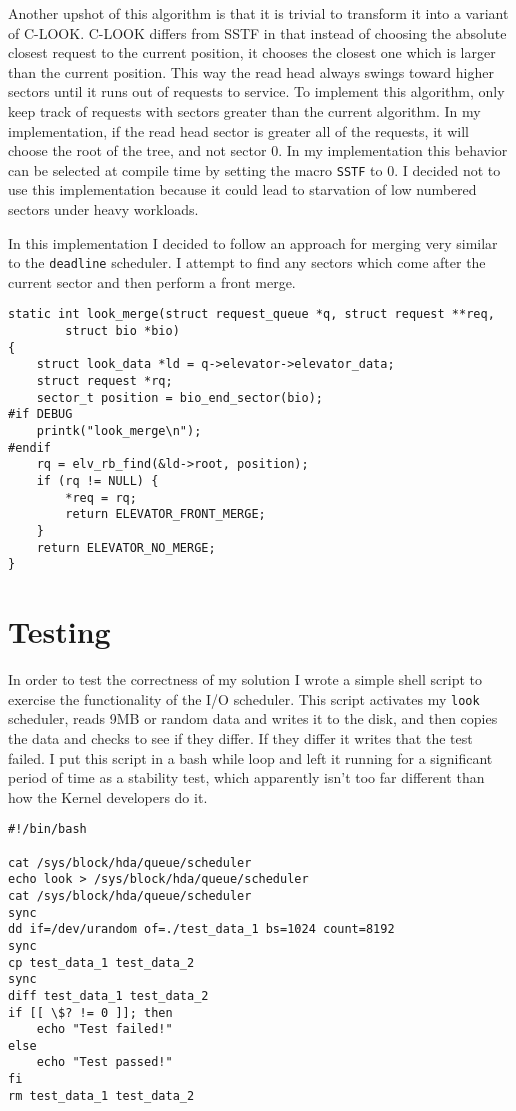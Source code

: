 \documentclass[10pt,conference,draftclsnofoot,onecolumn]{IEEEtran}
\begin{document}
Another upshot of this algorithm is that it is trivial to transform it into a variant of C-LOOK. C-LOOK differs from SSTF in that instead of choosing the absolute closest request to the current position, it chooses the closest one which is larger than the current position. This way the read head always swings toward higher sectors until it runs out of requests to service. To implement this algorithm, only keep track of requests with sectors greater than the current algorithm. In my implementation, if the read head sector is greater all of the requests, it will choose the root of the tree, and not sector 0. In my implementation this behavior can be selected at compile time by setting the macro \texttt{SSTF} to 0. I decided not to use this implementation because it could lead to starvation of low numbered sectors under heavy workloads.

In this implementation I decided to follow an approach for merging very similar to the \texttt{deadline} scheduler. I attempt to find any sectors which come after the current sector and then perform a front merge.

\begin{lstlisting}
static int look_merge(struct request_queue *q, struct request **req,
		struct bio *bio)
{
	struct look_data *ld = q->elevator->elevator_data;
	struct request *rq;
	sector_t position = bio_end_sector(bio);
#if DEBUG
	printk("look_merge\n");
#endif
	rq = elv_rb_find(&ld->root, position);
	if (rq != NULL) {
		*req = rq;
		return ELEVATOR_FRONT_MERGE;
	}
	return ELEVATOR_NO_MERGE;
}
\end{lstlisting}

\section{Testing}
In order to test the correctness of my solution I wrote a simple shell script to exercise the functionality of the I/O scheduler. This script activates my \texttt{look} scheduler, reads 9MB or random data and writes it to the disk, and then copies the data and checks to see if they differ. If they differ it writes that the test failed. I put this script in a bash while loop and left it running for a significant period of time as a stability test, which apparently isn't too far different than how the Kernel developers do it\cite{lkml}.
\begin{lstlisting}
#!/bin/bash

cat /sys/block/hda/queue/scheduler
echo look > /sys/block/hda/queue/scheduler
cat /sys/block/hda/queue/scheduler
sync
dd if=/dev/urandom of=./test_data_1 bs=1024 count=8192
sync
cp test_data_1 test_data_2
sync
diff test_data_1 test_data_2
if [[ \$? != 0 ]]; then
	echo "Test failed!"
else
	echo "Test passed!"
fi
rm test_data_1 test_data_2
\end{lstlisting}
\end{document}
